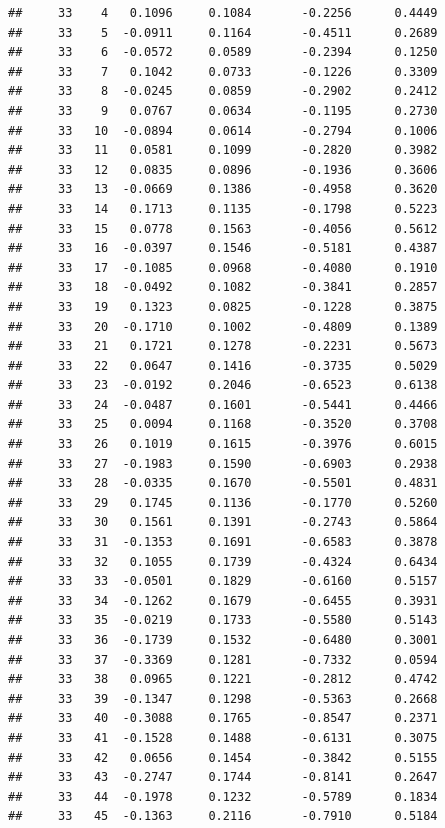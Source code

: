 \documentclass[
]{article}
\begin{document}
\begin{verbatim}
##     33    4   0.1096     0.1084       -0.2256      0.4449  
##     33    5  -0.0911     0.1164       -0.4511      0.2689  
##     33    6  -0.0572     0.0589       -0.2394      0.1250  
##     33    7   0.1042     0.0733       -0.1226      0.3309  
##     33    8  -0.0245     0.0859       -0.2902      0.2412  
##     33    9   0.0767     0.0634       -0.1195      0.2730  
##     33   10  -0.0894     0.0614       -0.2794      0.1006  
##     33   11   0.0581     0.1099       -0.2820      0.3982  
##     33   12   0.0835     0.0896       -0.1936      0.3606  
##     33   13  -0.0669     0.1386       -0.4958      0.3620  
##     33   14   0.1713     0.1135       -0.1798      0.5223  
##     33   15   0.0778     0.1563       -0.4056      0.5612  
##     33   16  -0.0397     0.1546       -0.5181      0.4387  
##     33   17  -0.1085     0.0968       -0.4080      0.1910  
##     33   18  -0.0492     0.1082       -0.3841      0.2857  
##     33   19   0.1323     0.0825       -0.1228      0.3875  
##     33   20  -0.1710     0.1002       -0.4809      0.1389  
##     33   21   0.1721     0.1278       -0.2231      0.5673  
##     33   22   0.0647     0.1416       -0.3735      0.5029  
##     33   23  -0.0192     0.2046       -0.6523      0.6138  
##     33   24  -0.0487     0.1601       -0.5441      0.4466  
##     33   25   0.0094     0.1168       -0.3520      0.3708  
##     33   26   0.1019     0.1615       -0.3976      0.6015  
##     33   27  -0.1983     0.1590       -0.6903      0.2938  
##     33   28  -0.0335     0.1670       -0.5501      0.4831  
##     33   29   0.1745     0.1136       -0.1770      0.5260  
##     33   30   0.1561     0.1391       -0.2743      0.5864  
##     33   31  -0.1353     0.1691       -0.6583      0.3878  
##     33   32   0.1055     0.1739       -0.4324      0.6434  
##     33   33  -0.0501     0.1829       -0.6160      0.5157  
##     33   34  -0.1262     0.1679       -0.6455      0.3931  
##     33   35  -0.0219     0.1733       -0.5580      0.5143  
##     33   36  -0.1739     0.1532       -0.6480      0.3001  
##     33   37  -0.3369     0.1281       -0.7332      0.0594  
##     33   38   0.0965     0.1221       -0.2812      0.4742  
##     33   39  -0.1347     0.1298       -0.5363      0.2668  
##     33   40  -0.3088     0.1765       -0.8547      0.2371  
##     33   41  -0.1528     0.1488       -0.6131      0.3075  
##     33   42   0.0656     0.1454       -0.3842      0.5155  
##     33   43  -0.2747     0.1744       -0.8141      0.2647  
##     33   44  -0.1978     0.1232       -0.5789      0.1834  
##     33   45  -0.1363     0.2116       -0.7910      0.5184  

\end{verbatim}
\end{document}
